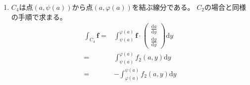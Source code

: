 \documentclass[12pt,b5paper]{ltjsarticle}
\begin{document}
\begin{enumerate}
 \item
      $C_4$は点$(a,\psi(a))$から点$(a,\varphi(a))$を結ぶ線分である。
      $C_2$の場合と同様の手順で求まる。
      \begin{align}
      \int_{C_4}\bm{f}
       =& \int_{\psi(a)}^{\varphi(a)}\bm{f}
             \cdot\begin{pmatrix}\frac{\mathrm{d}a}{\mathrm{d}y}\\\frac{\mathrm{d}y}{\mathrm{d}y}\end{pmatrix}\mathrm{d}y\\
       =& \int_{\psi(a)}^{\varphi(a)}f_2(a,y)\mathrm{d}y\\
       =& -\int_{\varphi(a)}^{\psi(a)}f_2(a,y)\mathrm{d}y
      \end{align}


\end{enumerate}
\hrulefill
\end{document}
